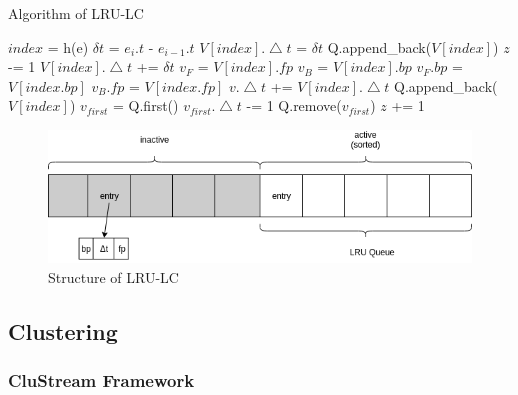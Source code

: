 \begin{algorithm}
\caption{Algorithm of LRU-LC}
\label{algo:LRU-LC}
\begin{algorithmic}[1]
\Input
\EndInput
\Output
\EndOutput

\State $index$ = h(e) 
\State $\delta t$ = $e_i.t$ - $e_{i-1}.t$
    \State $V[index].\bigtriangleup t$ = $\delta t$
    \State Q.append\_back($V[index]$)
    \State $z$ -= 1
\Else {}
     
        \State $V[index].\bigtriangleup t$ += $\delta t$
    \Else
        \State $v_F$ = $V[index].fp$
        \State $v_B$ = $V[index].bp$
        \State $v_F.bp$ = $V[index.bp]$
        \State $v_B.fp$ = $V[index.fp]$
        \State $v.\bigtriangleup t$ += $V[index].\bigtriangleup t$
        \State Q.append\_back($V[index]$)
    \EndIf
\EndIf
\State $v_{first}$ = Q.first() 
\State $v_{first}.\bigtriangleup t$ -= 1
    \State Q.remove($v_{first}$)
    \State $z$ += 1
\EndIf
\end{algorithmic}
\end{algorithm}

\begin{figure}
    \centering
    \includegraphics[width=0.8\columnwidth]{figures/LRU-LC.png}
    \caption{Structure of LRU-LC}
    \label{fig:LRU-LC}
\end{figure}

\subsection{Clustering}

\subsubsection{CluStream Framework}

